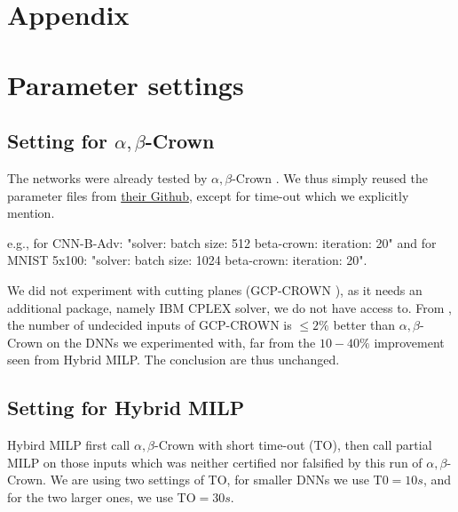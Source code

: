 \vspace{-0.6cm}

\section*{Appendix}

{\color{blue}
\section{Parameter settings}

\subsection*{Setting for $\alpha,\beta$-Crown}

The networks were already tested by $\alpha,\beta$-Crown \cite{crown}. We thus simply reused the parameter files from \href{https://github.com/Verified-Intelligence/alpha-beta-CROWN/blob/main/complete_verifier/exp_configs/beta_crown/}{their Github}, 
except for time-out which we explicitly mention.

e.g., for CNN-B-Adv: "solver: batch size: 512 beta-crown: iteration: 20" and
for MNIST 5x100: "solver: batch size: 1024 beta-crown: iteration: 20".

We did not experiment with cutting planes (GCP-CROWN \cite{cutting}), as it needs an additional package, namely IBM CPLEX solver, we do not have access to. From \cite{cutting}, the number of undecided inputs of GCP-CROWN is $\leq 2\%$ better than $\alpha,\beta$-Crown on the DNNs we experimented with, far from the $10-40\%$ improvement seen from Hybrid MILP. The conclusion are thus unchanged.
}

\subsection*{Setting for Hybrid MILP}


Hybird MILP first call $\alpha,\beta$-Crown with short time-out (TO), then call partial MILP on those inputs which was neither certified nor falsified by this run of $\alpha,\beta$-Crown. We are using two settings of TO, for smaller DNNs we use T0$=10s$, and for the two larger ones, we use TO$=30s$.


